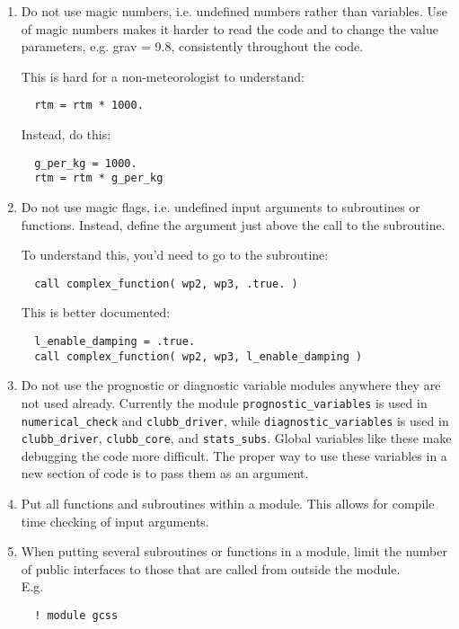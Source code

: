 \documentclass[letterpaper,12pt]{article}
\begin{document}
\begin{enumerate}
\item  Do not use magic numbers, i.e. undefined numbers rather than variables.
Use of magic numbers makes it harder to read the code and to change the value 
parameters, e.g. grav = 9.8, consistently throughout the code.

This is hard for a non-meteorologist to understand: 
\begin{verbatim}
  rtm = rtm * 1000. 
\end{verbatim}

Instead, do this:
\begin{verbatim}
  g_per_kg = 1000.
  rtm = rtm * g_per_kg
\end{verbatim}

\item  Do not use magic flags, i.e. undefined input arguments to subroutines or 
functions.  Instead, define the argument just above the call to the subroutine.

To understand this, you'd need to go to the subroutine: 
\begin{verbatim}
  call complex_function( wp2, wp3, .true. ) 
\end{verbatim}

This is better documented:
\begin{verbatim}
  l_enable_damping = .true.
  call complex_function( wp2, wp3, l_enable_damping )
\end{verbatim}

\item Do not use the prognostic or diagnostic variable modules anywhere they
are not used already.  Currently the module \texttt{prognostic\_variables} 
is used in 
\texttt{numerical\_check} and \texttt{clubb\_driver}, while 
\texttt{diagnostic\_variables} is used in \texttt{clubb\_driver}, 
\texttt{clubb\_core}, 
and \texttt{stats\_subs}. Global variables like these make debugging 
the code more difficult.  The proper way to use these variables in a new 
section of code is to pass them as an argument.
\newline

\item Put all functions and subroutines within a module.  This allows for 
compile time checking of input arguments. \newline

\item When putting several subroutines or functions in a module, limit the
 number of public interfaces to those that are called from outside the 
 module.\\
E.g. 
\begin{verbatim}
  ! module gcss


\end{verbatim}
\end{enumerate}
\end{document}
